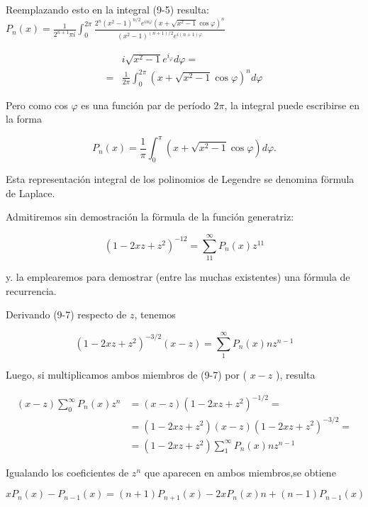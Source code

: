 \documentclass[10pt]{article}
\theoremstyle{plain}
\theoremstyle{definition}
\theoremstyle{remark}
\begin{document}
Reemplazando esto en la integral (9-5) resulta:\\
$P_{n}(x)=\frac{1}{2^{n+1} \pi i} \int_{0}^{2 \pi} \frac{2^{n}\left(x^{2}-1\right)^{n / 2} e^{i n \varphi}\left(x+\sqrt{x^{2}-1} \cos \varphi\right)^{n}}{\left(x^{2}-1\right)^{(n+1) / 2} e^{i(n+1) \varphi}}$

$$
\begin{aligned}
& i \sqrt{x^{2}-1} e^{i_{\varphi}} d \varphi= \\
= & \frac{1}{2 \pi} \int_{0}^{2 \pi}\left(x+\sqrt{x^{2}-1} \cos \varphi\right)^{n} d \varphi
\end{aligned}
$$

Pero como cos $\varphi$ es una función par de período $2 \pi$, la integral puede escribirse en la forma


\begin{equation*}
P_{n}(x)=\frac{1}{\pi} \int_{0}^{\pi}\left(x+\sqrt{x^{2}-1} \cos \varphi\right) d \varphi . \tag{9-6}
\end{equation*}


Esta representación integral de los polinomios de Legendre se denomina förmula de Laplace.

Admitiremos sin demostración la förmula de la función generatriz:


\begin{equation*}
\left(1-2 x z+z^{2}\right)^{-12}=\sum_{11}^{\infty} P_{n}(x) z^{11} \tag{9.7}
\end{equation*}


y. la emplearemos para demostrar (entre las muchas existentes) una fórmula de recurrencia.

Derivando (9-7) respecto de $z$, tenemos

$$
\left(1-2 x z+z^{2}\right)^{-3 / 2}(x-z)=\sum_{1}^{\infty} P_{n}(x) n z^{n-1}
$$

Luego, si multiplicamos ambos miembros de (9-7) por ( $x-z$ ), resulta

$$
\begin{aligned}
(x-z) \sum_{0}^{\infty} P_{n}(x) z^{n} & =(x-z)\left(1-2 x z+z^{2}\right)^{-1 / 2}= \\
& =\left(1-2 x z+z^{2}\right)(x-z)\left(1-2 x z+z^{2}\right)^{-3 / 2}= \\
& =\left(1-2 x z+z^{2}\right) \sum_{1}^{\infty} P_{n}(x) n z^{n-1}
\end{aligned}
$$

Igualando los coeficientes de $z^{n}$ que aparecen en ambos miembros,se obtiene

$$
x P_{n}(x)-P_{n-1}(x)=(n+1) P_{n+1}(x)-2 x P_{n}(x) n+(n-1) P_{n-1}(x)
$$
\end{document}
